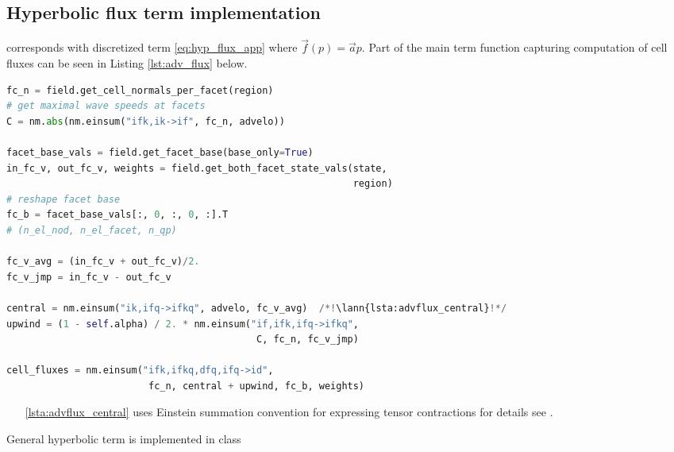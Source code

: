 \subsection{Hyperbolic flux term implementation}
\label{se:adv_flux_term_imp}
 corresponds with discretized term \eqref{eq:hyp_flux_app} 
where $\vec{f}(p) = \vec{a}p$. Part of the main term function capturing computation of 
cell fluxes can be seen in Listing \ref{lst:adv_flux} below. 
\setcounter{lstannotation}{0}
\begin{lstlisting}[language=Python, caption=Computation of advection cell 
fluxes \label{lst:adv_flux}]
fc_n = field.get_cell_normals_per_facet(region)
# get maximal wave speeds at facets
C = nm.abs(nm.einsum("ifk,ik->if", fc_n, advelo))

facet_base_vals = field.get_facet_base(base_only=True)
in_fc_v, out_fc_v, weights = field.get_both_facet_state_vals(state,
                                                             region)
# reshape facet base
fc_b = facet_base_vals[:, 0, :, 0, :].T
# (n_el_nod, n_el_facet, n_qp)

fc_v_avg = (in_fc_v + out_fc_v)/2.
fc_v_jmp = in_fc_v - out_fc_v

central = nm.einsum("ik,ifq->ifkq", advelo, fc_v_avg)  /*!\lann{lsta:advflux_central}!*/
upwind = (1 - self.alpha) / 2. * nm.einsum("if,ifk,ifq->ifkq",
                                            C, fc_n, fc_v_jmp)

cell_fluxes = nm.einsum("ifk,ifkq,dfq,ifq->id",
                         fc_n, central + upwind, fc_b, weights)
\end{lstlisting}
\begin{itemize}
	\item[\ref{lsta:advflux_central}]  uses Einstein 
	summation convention for expressing tensor contractions for details see 
	\cite{einsum-doc}.
\end{itemize}



General hyperbolic term is implemented in class 



